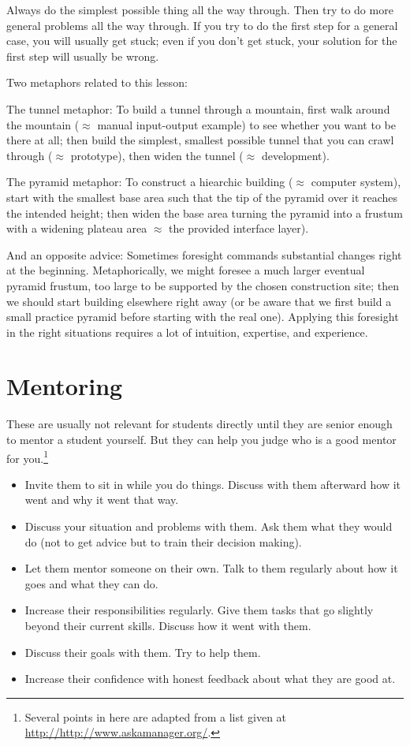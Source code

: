 \documentclass[12pt]{article}
\begin{document}
Always do the simplest possible thing all the way through.
Then try to do more general problems all the way through.
If you try to do the first step for a general case, you will usually get stuck; even if you don't get stuck, your solution for the first step will usually be wrong.

Two metaphors related to this lesson:
\begin{compactitem}
\item The tunnel metaphor: To build a tunnel through a mountain, first walk around the mountain ($\approx$ manual input-output example) to see whether you want to be there at all; then build the simplest, smallest possible tunnel that you can crawl through ($\approx$ prototype), then widen the tunnel ($\approx$ development).
\item The pyramid metaphor: To construct a hiearchic building ($\approx$ computer system), start with the smallest base area such that the tip of the pyramid over it reaches the intended height; then widen the base area turning the pyramid into a frustum with a widening plateau area $\approx$ the provided interface layer).
\end{compactitem}

And an opposite advice: Sometimes foresight commands substantial changes right at the beginning.
Metaphorically, we might foresee a much larger eventual pyramid frustum, too large to be supported by the chosen construction site; then we should start building elsewhere right away (or be aware that we first build a small practice pyramid before starting with the real one).
Applying this foresight in the right situations requires a lot of intuition, expertise, and experience.

\section{Mentoring}

These are usually not relevant for students directly until they are senior enough to mentor a student yourself.
But they can help you judge who is a good mentor for you.\footnote{Several points in here are adapted from a list given at \url{http://http://www.askamanager.org/}.}

\begin{itemize}
\item Invite them to sit in while you do things. Discuss with them afterward how it went and why it went that way.
\item Discuss your situation and problems with them. Ask them what they would do (not to get advice but to train their decision making).
\item Let them mentor someone on their own. Talk to them regularly about how it goes and what they can do.
\item Increase their responsibilities regularly. Give them tasks that go slightly beyond their current skills. Discuss how it went with them.
\item Discuss their goals with them. Try to help them.
\item Increase their confidence with honest feedback about what they are good at.
\end{itemize}
\end{document}
